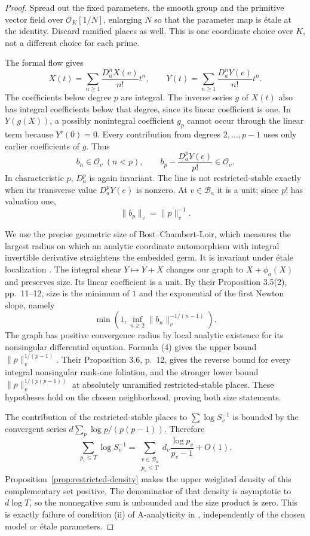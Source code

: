 \documentclass[11pt]{article}
\theoremstyle{definition}\newtheorem{definition}[theorem]{Definition}
\theoremstyle{remark}\newtheorem{remark}[theorem]{Remark}
\begin{document}
\begin{proof}
Spread out the fixed parameters, the smooth group and the primitive vector field over $\mathcal O_K[1/N]$, enlarging $N$ so that the parameter map is \'etale at the identity. Discard ramified places as well. This is one coordinate choice over $K$, not a different choice for each prime.

The formal flow gives
\[
 X(t)=\sum_{n\ge1}\frac{D_a^nX(e)}{n!}t^n,
 \qquad Y(t)=\sum_{n\ge1}\frac{D_a^nY(e)}{n!}t^n.
\]
The coefficients below degree $p$ are integral. The inverse series $g$ of $X(t)$ also has integral coefficients below that degree, since its linear coefficient is one. In $Y(g(X))$, a possibly nonintegral coefficient $g_p$ cannot occur through the linear term because $Y'(0)=0$. Every contribution from degrees $2,\ldots,p-1$ uses only earlier coefficients of $g$. Thus
\[
 b_n\in\mathcal O_v\ (n<p),\qquad
 b_p-\frac{D_a^pY(e)}{p!}\in\mathcal O_v.
\]
In characteristic $p$, $D_a^p$ is again invariant. The line is not restricted-stable exactly when its transverse value $D_a^pY(e)$ is nonzero. At $v\in\mathcal B_a$ it is a unit; since $p!$ has valuation one,
\[
                         \|b_p\|_v=\|p\|_v^{-1}.          \tag{4}
\]

We use the precise geometric size of Bost--Chambert-Loir, which measures the largest radius on which an analytic coordinate automorphism with integral invertible derivative straightens the embedded germ. It is invariant under \'etale localization \cite[Theorem 3.1, pp.~9--10]{BostChambertLoir}. The integral shear $Y\mapsto Y+X$ changes our graph to $X+\phi_a(X)$ and preserves size. Its linear coefficient is a unit. By their Proposition 3.5(2), pp.~11--12, size is the minimum of $1$ and the exponential of the first Newton slope, namely
\[
       \min\left(1,\inf_{n\ge2}\|b_n\|_v^{-1/(n-1)}\right).
\]
The graph has positive convergence radius by local analytic existence for its nonsingular differential equation. Formula (4) gives the upper bound $\|p\|_v^{1/(p-1)}$. Their Proposition 3.6, p.~12, gives the reverse bound for every integral nonsingular rank-one foliation, and the stronger lower bound $\|p\|_v^{1/(p(p-1))}$ at absolutely unramified restricted-stable places. These hypotheses hold on the chosen neighborhood, proving both size statements.

The contribution of the restricted-stable places to $\sum\log S_v^{-1}$ is bounded by the convergent series $d\sum_p\log p/(p(p-1))$. Therefore
\[
 \sum_{p_v\le T}\log S_v^{-1}
    =\sum_{\substack{v\in\mathcal B_a\\p_v\le T}}
                 d_v\frac{\log p_v}{p_v-1}+O(1).
\]
Proposition~\ref{prop:restricted-density} makes the upper weighted density of this complementary set positive. The denominator of that density is asymptotic to $d\log T$, so the nonnegative sum is unbounded and the size product is zero. This is exactly failure of condition (ii) of A-analyticity in \cite[Definition 3.7, p.~13]{BostChambertLoir}, independently of the chosen model or \'etale parameters.


\end{proof}
\end{document}
